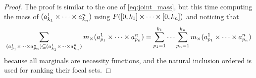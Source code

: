 \begin{proof}
    The proof is similar to the one of \cref{eq:joint_mass}, but this time computing the mass of $(a_{k_1}^1\times\dots\times a_{k_n}^n)$ using $F([0,k_1]\times\dots\times[0,k_n])$ and noticing that \begin{eqnarray*}
        \sum_{(a^1_{p_1}\times\dots\times a^n_{p_n})\subseteq(a^1_{k_1}\times\dots\times a^n_{k_n})}m_\times(a^1_{p_1}\times\dots\times a^n_{p_n})=\sum_{p_1=1}^{k_1}\dots\sum_{p_n=1}^{k_n} m_\times(a^1_{p_1}\times\dots\times a^n_{p_n})
    \end{eqnarray*} because all marginals are necessity functions, and the natural inclusion ordered is used for ranking their focal sets.
\end{proof}

